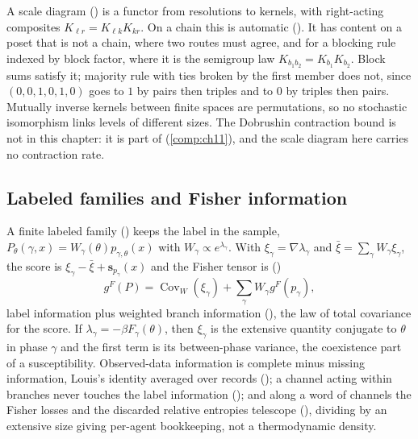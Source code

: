 A scale diagram () is a functor from resolutions to kernels, with right-acting
composites $K_{\ell r}=K_{\ell k}K_{kr}$. On a chain this is automatic ().
It has content on a poset that is not a chain, where two routes must agree, and for a blocking rule
indexed by block factor, where it is the semigroup law $K_{b_1b_2}=K_{b_1}K_{b_2}$. Block sums satisfy it;
majority rule with ties broken by the first member does not, since $(0,0,1,0,1,0)$ goes to $1$ by pairs
then triples and to $0$ by triples then pairs. Mutually inverse kernels between finite spaces are
permutations, so no stochastic isomorphism links levels of different sizes. The Dobrushin contraction
bound is not in this chapter: it is part of  (\cref{comp:ch11}), and
the scale diagram here carries no contraction rate.

\subsection{Labeled families and Fisher information}

A finite labeled family () keeps the label in the sample,
$P_\theta(\gamma,x)=W_\gamma(\theta)p_{\gamma,\theta}(x)$ with $W_\gamma\propto e^{\lambda_\gamma}$. With
$\xi_\gamma=\nabla\lambda_\gamma$ and $\bar\xi=\sum_\gamma W_\gamma\xi_\gamma$, the score is
$\xi_\gamma-\bar\xi+\mathbf s_{p_\gamma}(x)$ and the Fisher tensor is
()
\[
g^F(P)=\operatorname{Cov}_W(\xi_\gamma)+\sum_\gamma W_\gamma g^F(p_\gamma),
\]
label information plus weighted branch information (), the law
of total covariance for the score. If $\lambda_\gamma=-\beta F_\gamma(\theta)$, then $\xi_\gamma$ is the
extensive quantity conjugate to $\theta$ in phase $\gamma$ and the first term is its between-phase
variance, the coexistence part of a susceptibility. Observed-data information is complete minus missing
information, Louis's identity \citep{Louis1982} averaged over records
(); a channel acting within branches never touches the
label information (); and along a word of channels the Fisher
losses and the discarded relative entropies telescope (), dividing by an
extensive size giving per-agent bookkeeping, not a thermodynamic density.


